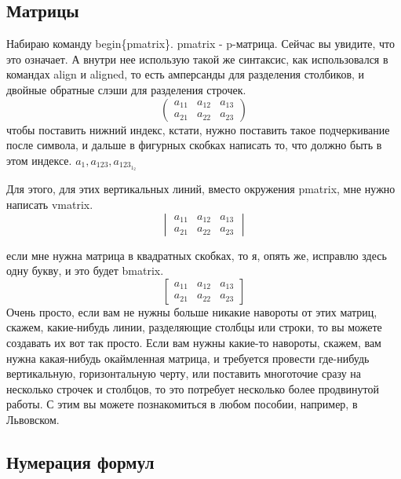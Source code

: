 \documentclass[a4paper,12pt]{article} %
\begin{document}
{ \subsection{Матрицы}
 
 Набираю команду begin\{pmatrix\}. pmatrix - p-матрица. Сейчас вы увидите, что
 	это означает. А внутри нее использую такой же синтаксис,
 	как использовался в командах align и aligned, то есть амперсанды для разделения
 	столбиков, и двойные обратные слэши для разделения
 	строчек. 
 \[
 \begin{pmatrix}
 a_{11} & a_{12} & a_{13} \\
 a_{21} & a_{22} & a_{23}
 \end{pmatrix}
 \]
 чтобы  поставить нижний индекс, кстати, нужно поставить такое подчеркивание после
 символа, и дальше в фигурных скобках написать то, что должно
 быть в этом индексе. $a_1, a_123, a_{123_{1_{2}}}$
 
  Для этого, для этих вертикальных линий,
  вместо окружения pmatrix, мне нужно написать
  vmatrix.
 \[
 \begin{vmatrix}
 a_{11} & a_{12} & a_{13} \\
 a_{21} & a_{22} & a_{23}
 \end{vmatrix}
 \]
 
 если мне нужна матрица в
 квадратных скобках, то я, опять же, исправлю здесь
 одну букву, и это будет bmatrix. 
 \[
 \begin{bmatrix}
 a_{11} & a_{12} & a_{13} \\
 a_{21} & a_{22} & a_{23}
 \end{bmatrix}
 \]
 Очень просто, если вам не нужны больше
 никакие навороты от этих матриц, скажем, какие-нибудь линии, разделяющие столбцы
 или строки, то вы можете создавать их вот так просто. Если вам нужны какие-то навороты, скажем,
 вам нужна какая-нибудь окаймленная матрица, и требуется провести где-нибудь
 вертикальную, горизонтальную черту, или поставить многоточие сразу на
 несколько строчек и столбцов, то это потребует несколько
 более продвинутой работы. С этим вы можете познакомиться в любом
 пособии, например, в Львовском. 
 
 \subsection{Нумерация формул}
 
}
\end{document}
